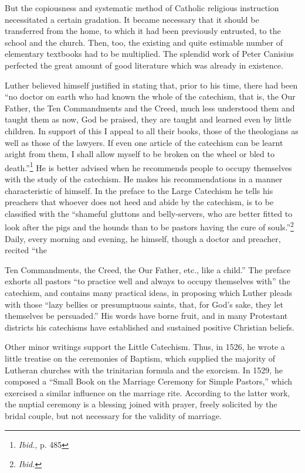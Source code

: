 But the
copiousness and systematic method of Catholic religious instruction
necessitated a certain gradation. It became necessary that it should be
transferred from the home, to which it had been previously entrusted,
to the school and the church. Then, too, the existing and quite estimable
number of elementary textbooks had to be multiplied. The
splendid work of Peter Canisius perfected the great amount of good
literature which was already in existence.

Luther believed himself justified in stating that, prior to his time, there
had been “no doctor on earth who had known the whole of the catechism,
that is, the Our Father, the Ten Commandments and the Creed, much less
understood them and taught them as now, God be praised, they are taught
and learned even by little children. In support of this I appeal to all their
books, those of the theologians as well as those of the lawyers. If even one
article of the catechism can be learnt aright from them, I shall allow myself
to be broken on the wheel or bled to death.”\footnote{\textit{Ibid.}, p. 485}
 He is better advised when he
recommends people to occupy themselves with the study of the catechism. He
makes his recommendations in a manner characteristic of himself. In the
preface to the Large Catechism he tells his preachers that whoever does not
heed and abide by the catechism, is to be classified with the “shameful
gluttons and belly-servers, who are better fitted to look after the pigs and
the hounds than to be pastors having the cure of souls.”\footnote{\textit{Ibid.}}
 Daily, every
morning and evening, he himself, though a doctor and preacher, recited “the

Ten Commandments, the Creed, the Our Father, etc., like a child.” The
preface exhorts all pastors “to practice well and always to occupy
themselves with” the catechism, and contains many practical ideas, in
proposing which Luther pleads with those “lazy bellies or presumptuous saints,
that, for God’s sake, they let themselves be persuaded.” His words have borne
fruit, and in many Protestant districts his catechisms have established and
sustained positive Christian beliefs.

Other minor writings support the Little Catechism. Thus, in 1526,
he wrote a little treatise on the ceremonies of Baptism, which supplied
the majority of Lutheran churches with the trinitarian formula and
the exorcism. In 1529, he composed a “Small Book on the Marriage
Ceremony for Simple Pastors,” which exercised a similar influence on
the marriage rite. According to the latter work, the nuptial ceremony
is a blessing joined with prayer, freely solicited by the bridal couple,
but not necessary for the validity of marriage.

